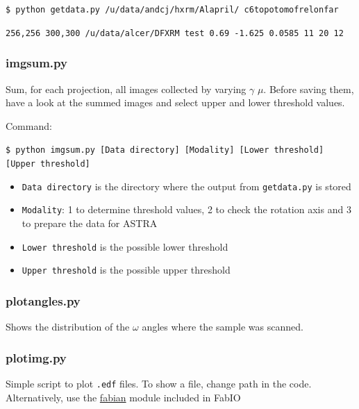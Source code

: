 \documentclass[11pt]{scrartcl}
\begin{document}
{\texttt{\$ python getdata.py /u/data/andcj/hxrm/Al\textunderscore april/ c6\textunderscore topotomo\textunderscore frelon\textunderscore far\textunderscore}} 

{\texttt{256,256 300,300 /u/data/alcer/DFXRM test 0.69 -1.625 0.0585 11 20 12}}

\subsubsection{img\textunderscore sum.py}

Sum, for each projection, all images collected by varying $\gamma$ $\mu$. Before saving them, have a look at the summed images and select upper and lower threshold values.

Command: 

{\texttt{\$ python img\textunderscore sum.py [Data directory] [Modality] [Lower threshold] [Upper threshold]}}

\begin{itemize}
    \item {\texttt{Data directory}} is the directory where the output from {\texttt{getdata.py}} is stored
    \item {\texttt{Modality}}: 1 to determine threshold values, 2 to check the rotation axis and 3 to prepare the data for {\footnotesize{ASTRA}}
    \item {\texttt{Lower threshold}} is the possible lower threshold
    \item {\texttt{Upper threshold}} is the possible upper threshold
    
\end{itemize}

\subsubsection{plot\textunderscore angles.py}

Shows the distribution of the $\omega$ angles where the sample was scanned. 

\subsubsection{plot\textunderscore img.py}

Simple script to plot {\texttt{.edf}} files. To show a file, change path in the code. Alternatively, use the \href{https://sourceforge.net/p/fable/wiki/fabian/}{fabian} module included in FabIO \cite{knudsen2013fabio}
\end{document}
